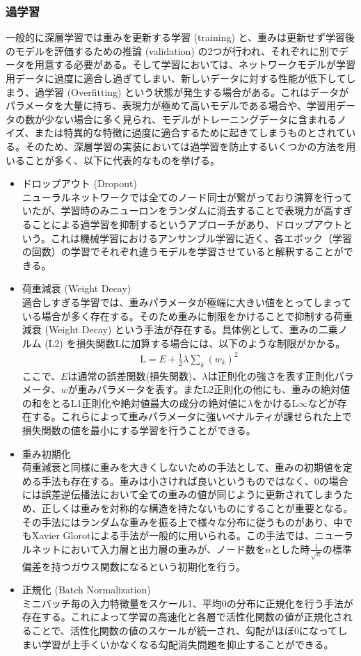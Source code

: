 \subsubsection{過学習}
一般的に深層学習では重みを更新する学習 (training) と、重みは更新せず学習後のモデルを評価するための推論 (validation) の2つが行われ、それぞれに別でデータを用意する必要がある。そして学習においては、ネットワークモデルが学習用データに過度に適合し過ぎてしまい、新しいデータに対する性能が低下してしまう、過学習 (Overfitting) という状態が発生する場合がある。これはデータがパラメータを大量に持ち、表現力が極めて高いモデルである場合や、学習用データの数が少ない場合に多く見られ、モデルがトレーニングデータに含まれるノイズ、または特異的な特徴に過度に適合するために起きてしまうものとされている。そのため、深層学習の実装においては過学習を防止するいくつかの方法を用いることが多く、以下に代表的なものを挙げる。
\begin{itemize}
\item ドロップアウト (Dropout)\\
ニューラルネットワークでは全てのノード同士が繋がっており演算を行っていたが、学習時のみニューロンをランダムに消去することで表現力が高すぎることによる過学習を抑制するというアプローチがあり、ドロップアウトという。これは機械学習におけるアンサンブル学習に近く、各エポック（学習の回数）の学習でそれぞれ違うモデルを学習させていると解釈することができる。
\item 荷重減衰 (Weight Decay)\\
適合しすぎる学習では、重みパラメータが極端に大きい値をとってしまっている場合が多く存在する。そのため重みに制限をかけることで抑制する荷重減衰 (Weight Decay) という手法が存在する。具体例として、重みの二乗ノルム (L2) を損失関数$\mathrm{L}$に加算する場合には、以下のような制限がかかる。
\begin{align}
\mathrm{L} = E + \frac{1}{2}\lambda \sum_k {(w_k)}^2
\end{align}
ここで、$E$は通常の誤差関数(損失関数)、$\lambda$は正則化の強さを表す正則化パラメータ、$w$が重みパラメータを表す。またL2正則化の他にも、重みの絶対値の和をとるL1正則化や絶対値最大の成分の絶対値に$\lambda$をかけるL$\infty$などが存在する。これらによって重みパラメータに強いペナルティが課せられた上で損失関数の値を最小にする学習を行うことができる。
\item 重み初期化\\
荷重減衰と同様に重みを大きくしないための手法として、重みの初期値を定める手法も存在する。重みは小さければ良いというものではなく、0の場合には誤差逆伝播法において全ての重みの値が同じように更新されてしまうため、正しくは重みを対称的な構造を持たないものにすることが重要となる。その手法にはランダムな重みを振る上で様々な分布に従うものがあり、中でもXavier Glorotによる手法\cite{init}が一般的に用いられる。この手法では、ニューラルネットにおいて入力層と出力層の重みが、ノード数を$n$とした時$\frac{1}{\sqrt{n}}$の標準偏差を持つガウス関数になるという初期化を行う。
\item 正規化 (Batch Normalization)\\
ミニバッチ毎の入力特徴量をスケール1、平均0の分布に正規化を行う手法が存在する。これによって学習の高速化と各層で活性化関数の値が正規化されることで、活性化関数の値のスケールが統一され、勾配がほぼ0になってしまい学習が上手くいかなくなる勾配消失問題を抑止することができる。
\end{itemize}
